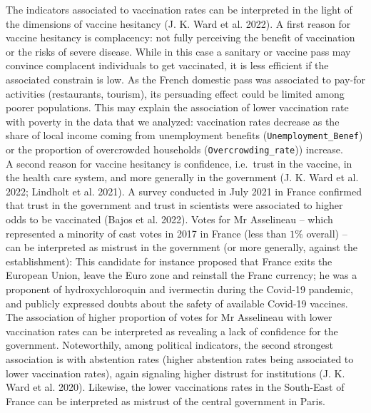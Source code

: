 \documentclass[
]{article}
\begin{document}
The indicators associated to vaccination rates can be interpreted in the light of the dimensions of vaccine hesitancy (J. K. Ward et al. 2022). A first reason for vaccine hesitancy is complacency: not fully perceiving the benefit of vaccination or the risks of severe disease. While in this case a sanitary or vaccine pass may convince complacent individuals to get vaccinated, it is less efficient if the associated constrain is low. As the French domestic pass was associated to pay-for activities (restaurants, tourism), its persuading effect could be limited among poorer populations. This may explain the association of lower vaccination rate with poverty in the data that we analyzed: vaccination rates decrease as the share of local income coming from unemployment benefits (\texttt{Unemployment\_Benef}) or the proportion of overcrowded households (\texttt{Overcrowding\_rate})) increase.\\
A second reason for vaccine hesitancy is confidence, i.e.~trust in the vaccine, in the health care system, and more generally in the government (J. K. Ward et al. 2022; Lindholt et al. 2021). A survey conducted in July 2021 in France confirmed that trust in the government and trust in scientists were associated to higher odds to be vaccinated (Bajos et al. 2022). Votes for Mr Asselineau -- which represented a minority of cast votes in 2017 in France (less than \(1\%\) overall) -- can be interpreted as mistrust in the government (or more generally, against the establishment): This candidate for instance proposed that France exits the European Union, leave the Euro zone and reinstall the Franc currency; he was a proponent of hydroxychloroquin and ivermectin during the Covid-19 pandemic, and publicly expressed doubts about the safety of available Covid-19 vaccines. The association of higher proportion of votes for Mr Asselineau with lower vaccination rates can be interpreted as revealing a lack of confidence for the government. Noteworthily, among political indicators, the second strongest association is with abstention rates (higher abstention rates being associated to lower vaccination rates), again signaling higher distrust for institutions (J. K. Ward et al. 2020). Likewise, the lower vaccinations rates in the South-East of France can be interpreted as mistrust of the central government in Paris.\\
\end{document}
